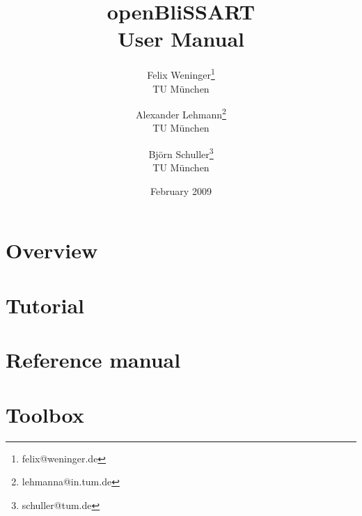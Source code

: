 \documentclass[a4paper,11pt]{book}
\author{
    Felix Weninger\thanks{felix@weninger.de}\\TU M\"unchen
    \and Alexander Lehmann\thanks{lehmanna@in.tum.de}\\TU M\"unchen
    \and Bj\"orn Schuller\thanks{schuller@tum.de}\\TU M\"unchen
}
\date{February 2009}
\title{
    openBliSSART\\[0.5cm]
    User Manual
}
\begin{document}
\maketitle


\newpage


\tableofcontents




\chapter{Overview}
\label{chapter:Overview}





\chapter{Tutorial}
\label{chapter:Tutorial}





\chapter{Reference manual}
\label{chapter:RefManual}



\chapter{Toolbox}
\label{chapter:Toolbox}



\clearpage




\end{document}
